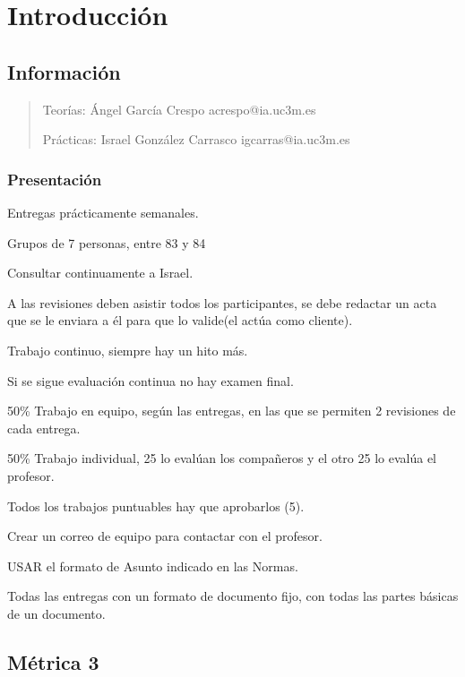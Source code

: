 \documentclass[12pt]{report} %
\begin{document}
\clearpage
{} %



\part{Introducción}

\chapter{Información}

\begin{quote}
Teorías: Ángel García Crespo acrespo@ia.uc3m.es

Prácticas: Israel González Carrasco igcarras@ia.uc3m.es
\end{quote}

\section{Presentación}

Entregas prácticamente semanales.

Grupos de 7 personas, entre 83 y 84

Consultar continuamente a Israel.

A las revisiones deben asistir todos los participantes, se debe redactar
un acta que se le enviara a él para que lo valide(el actúa como
cliente).

Trabajo continuo, siempre hay un hito más.

Si se sigue evaluación continua no hay examen final.

50\% Trabajo en equipo, según las entregas, en las que se permiten 2
revisiones de cada entrega.

50\% Trabajo individual, 25 lo evalúan los compañeros y el otro 25 lo
evalúa el profesor.

Todos los trabajos puntuables hay que aprobarlos (5).

Crear un correo de equipo para contactar con el profesor.

USAR el formato de Asunto indicado en las Normas.

Todas las entregas con un formato de documento fijo, con todas las
partes básicas de un documento.

\chapter{Métrica 3}
\end{document}

